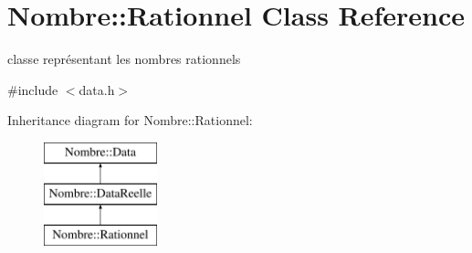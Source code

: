 \hypertarget{classNombre_1_1Rationnel}{
\section{Nombre::Rationnel Class Reference}
\label{classNombre_1_1Rationnel}
}


classe représentant les nombres rationnels  




{\ttfamily \#include $<$data.h$>$}

Inheritance diagram for Nombre::Rationnel:\begin{figure}[H]
\begin{center}
\leavevmode
\includegraphics[height=3cm]{classNombre_1_1Rationnel}
\end{center}
\end{figure}
